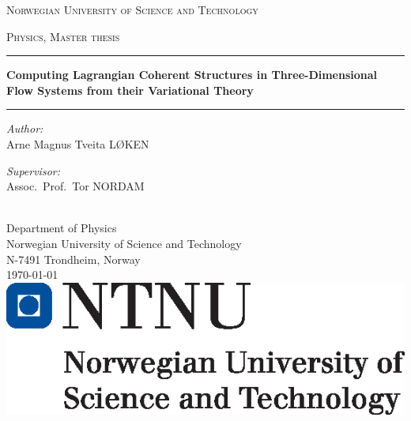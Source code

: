 \begingroup
{}
\begin{titlingpage}
    \begin{center}
        \vspace*{.04\textheight}
        {\scshape \fontsize{17pt}{17pt}\selectfont Norwegian University of Science and Technology\par}%
        \vspace{0.75cm}\textsc{\large Physics, Master thesis}\vspace{0.4cm}

        \hrule\phantom{}\vspace{0.4cm}
        {\LARGE \bfseries Computing Lagrangian Coherent Structures in
            Three-Dimensional Flow Systems from their Variational Theory
        \par}\vspace{0.8cm}
        \hrule\phantom{}\vspace{1cm}

        \begin{minipage}[t]{0.45\textwidth}
            \begin{flushleft}\large
                \emph{Author:}\\
                Arne Magnus Tveita LØKEN
            \end{flushleft}
        \end{minipage}
        \begin{minipage}[t]{0.45\textwidth}
            \begin{flushright}\large
                \emph{Supervisor:}\\
                Assoc.\ Prof.\ Tor NORDAM
            \end{flushright}
        \end{minipage}\\[2cm]


        \large {Department of Physics\\%
            Norwegian University of Science and Technology\\%
        N-7491 Trondheim, Norway}\\[1.5cm]
        {\large \today}\\[0.5cm]
        \includegraphics{titlepage/hovedlogo_eng.eps}
    \end{center}
\end{titlingpage}
\endgroup
\cleartorecto
